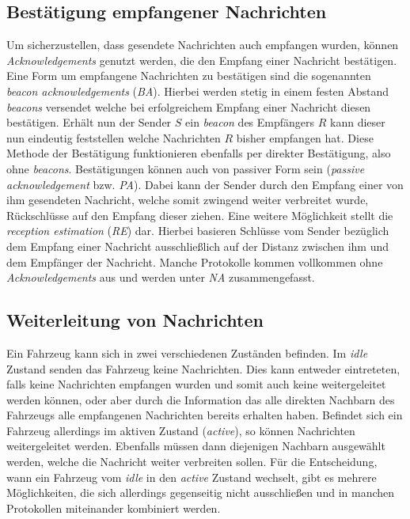 \documentclass[english,runningheads,a4paper]{llncs}[2018/03/10]
\begin{document}
\subsection{Bestätigung empfangener Nachrichten}
Um sicherzustellen, dass gesendete Nachrichten auch empfangen wurden, können \textit{Acknowledgements} genutzt werden, die den Empfang einer Nachricht bestätigen.
Eine Form um empfangene Nachrichten zu bestätigen sind die sogenannten \textit{beacon acknowledgements} (\textit{BA}).
Hierbei werden stetig in einem festen Abstand \textit{beacons} versendet welche bei erfolgreichem Empfang einer Nachricht diesen bestätigen.
Erhält nun der Sender $S$ ein \textit{beacon} des Empfängers $R$ kann dieser nun eindeutig feststellen welche Nachrichten $R$ bisher empfangen hat.
Diese Methode der Bestätigung funktionieren ebenfalls per direkter Bestätigung, also ohne \textit{beacons}.
Bestätigungen können auch von passiver Form sein (\textit{passive acknowledgement} bzw. \textit{PA}).
Dabei kann der Sender durch den Empfang einer von ihm gesendeten Nachricht, welche somit zwingend weiter verbreitet wurde, Rückschlüsse auf den Empfang dieser ziehen.
Eine weitere Möglichkeit stellt die \textit{reception estimation} (\textit{RE}) dar.
Hierbei basieren Schlüsse vom Sender bezüglich dem Empfang einer Nachricht ausschließlich auf der Distanz zwischen ihm und dem Empfänger der Nachricht.
Manche Protokolle kommen vollkommen ohne \textit{Acknowledgements} aus und werden unter \textit{NA} zusammengefasst.

\subsection{Weiterleitung von Nachrichten}
Ein Fahrzeug kann sich in zwei verschiedenen Zuständen befinden.
Im \textit{idle} Zustand senden das Fahrzeug keine Nachrichten.
Dies kann entweder eintreteten, falls keine Nachrichten empfangen wurden und somit auch keine weitergeleitet werden können, oder aber durch die Information das alle direkten Nachbarn des Fahrzeugs alle empfangenen Nachrichten bereits erhalten haben.
Befindet sich ein Fahrzeug allerdings im aktiven Zustand (\textit{active}), so können Nachrichten weitergeleitet werden.
Ebenfalls müssen dann diejenigen Nachbarn ausgewählt werden, welche die Nachricht weiter verbreiten sollen.
Für die Entscheidung, wann ein Fahrzeug vom \textit{idle} in den \textit{active} Zustand wechselt, gibt es mehrere Möglichkeiten, die sich allerdings gegenseitig nicht ausschließen und in manchen Protokollen miteinander kombiniert werden.
\end{document}
